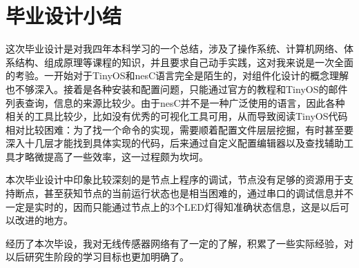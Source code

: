 \chapter*{毕业设计小结}

这次毕业设计是对我四年本科学习的一个总结，涉及了操作系统、计算机网络、体系结构、组成原理等课程的知识，并且要求自己动手实践，这对我来说是一次全面的考验。一开始对于TinyOS和nesC语言完全是陌生的，对组件化设计的概念理解也不够深入。接着是各种安装和配置问题，只能通过官方的教程和TinyOS的邮件列表查询，信息的来源比较少。由于nesC并不是一种广泛使用的语言，因此各种相关的工具比较少，比如没有优秀的可视化工具可用，从而导致阅读TinyOS代码相对比较困难：为了找一个命令的实现，需要顺着配置文件层层挖掘，有时甚至要深入十几层才能找到具体实现的代码，后来通过自定义配置编辑器以及查找辅助工具才略微提高了一些效率，这一过程颇为坎坷。

本次毕业设计中印象比较深刻的是节点上程序的调试，节点没有足够的资源用于支持断点，甚至获知节点的当前运行状态也是相当困难的，通过串口的调试信息并不一定是实时的，因而只能通过节点上的3个LED灯得知准确状态信息，这是以后可以改进的地方。

经历了本次毕设，我对无线传感器网络有了一定的了解，积累了一些实际经验，对以后研究生阶段的学习目标也更加明确了。



